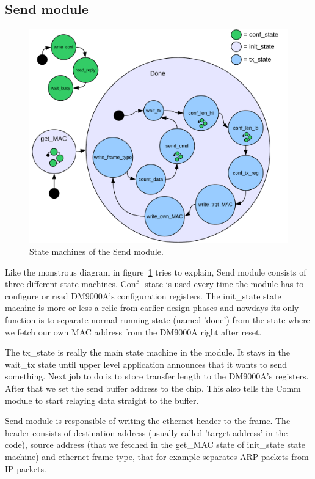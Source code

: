 \documentclass{article}
\begin{document}
\subsection{Send module}

\begin{figure}[hbt]
  \includegraphics[scale=.5]{send_module_states}
  \caption{State machines of the Send module.}
  \label{fig:sendStates}
\end{figure}

Like the monstrous diagram in figure~\ref{fig:sendStates} tries to
explain, Send module consists of three different state machines.
Conf\_state is used every time the module has to configure or read
DM9000A's configuration registers. The init\_state state machine is
more or less a relic from earlier design phases and nowdays its only
function is to separate normal running state (named 'done') from the
state where we fetch our own MAC address from the DM9000A right after
reset.

The tx\_state is really the main state machine in the module. It stays
in the wait\_tx state until upper level application announces that it
wants to send something. Next job to do is to store transfer length to
the DM9000A's registers. After that we set the send buffer address to
the chip. This also tells the Comm module to start relaying data
straight to the buffer.

Send module is responsible of writing the ethernet header to the
frame.  The header consists of destination address (usually called
'target address' in the code), source address (that we fetched in the
get\_MAC state of init\_state state machine) and ethernet frame type,
that for example separates ARP packets from IP packets.
\end{document}
